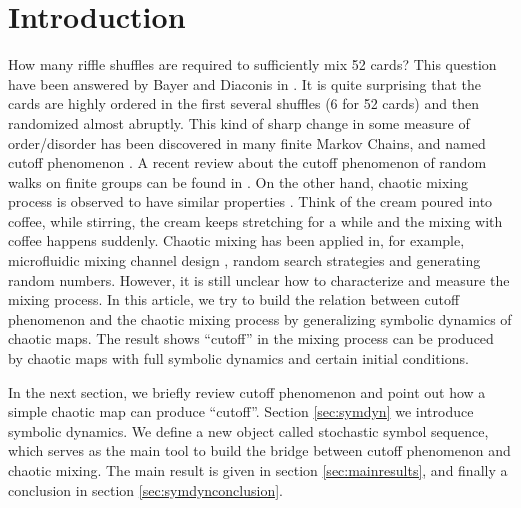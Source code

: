 %
%
\section{Introduction}
\label{sec:symdynintro}

How many riffle shuffles are required to sufficiently mix 52 cards? This question have been
answered by Bayer and Diaconis in \cite{Diaconis1992}. It is quite surprising that the cards are
highly ordered in the first several shuffles (6 for 52 cards) and then randomized almost abruptly.
This kind of sharp change in some measure of order/disorder has been discovered in many finite
Markov Chains, and named cutoff phenomenon \cite{Diaconis1986}. A recent review about the cutoff
phenomenon of random walks on finite groups can be found in \cite{LSaloff-Costt2004}. On the other
hand, chaotic mixing process is observed to have similar
properties \cite{Thiffeault2003-13, Thiffeault2004, Tsang2005}. Think of the cream poured
into coffee, while stirring, the cream keeps stretching for a while and the mixing with coffee
happens suddenly. Chaotic mixing has been applied in, for example, microfluidic mixing channel
design \cite{Ottino2004Science, Wiggins2004, Ottino2004}, random search strategies and
generating random numbers. However, it is still unclear how to characterize and measure the mixing
process. In this article, we try to build the relation between cutoff phenomenon and the chaotic
mixing process by generalizing symbolic dynamics of chaotic maps. The result shows ``cutoff'' in
the mixing process can be produced by chaotic maps with full symbolic dynamics and certain initial
conditions.

In the next section, we briefly review cutoff phenomenon and point out how a simple chaotic map can produce ``cutoff''. Section \ref{sec:symdyn} we
introduce symbolic dynamics. We define a new object called stochastic symbol sequence, which serves as the main tool to build the bridge
between cutoff phenomenon and chaotic mixing. The main result is given in section \ref{sec:mainresults}, and finally a conclusion in section \ref{sec:symdynconclusion}.


